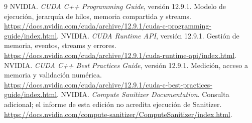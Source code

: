 \documentclass[12pt,a4paper,oneside]{report}
\begin{document}
\begin{thebibliography}{9}
 NVIDIA. \emph{CUDA C++ Programming Guide}, versión 12.9.1. Modelo de ejecución, jerarquía de hilos, memoria compartida y streams. \url{https://docs.nvidia.com/cuda/archive/12.9.1/cuda-c-programming-guide/index.html}.
 NVIDIA. \emph{CUDA Runtime API}, versión 12.9.1. Gestión de memoria, eventos, streams y errores. \url{https://docs.nvidia.com/cuda/archive/12.9.1/cuda-runtime-api/index.html}.
 NVIDIA. \emph{CUDA C++ Best Practices Guide}, versión 12.9.1. Medición, acceso a memoria y validación numérica. \url{https://docs.nvidia.com/cuda/archive/12.9.1/cuda-c-best-practices-guide/index.html}.
 NVIDIA. \emph{Compute Sanitizer Documentation}. Consulta adicional; el informe de esta edición no acredita ejecución de Sanitizer. \url{https://docs.nvidia.com/compute-sanitizer/ComputeSanitizer/index.html}.
\end{thebibliography}
\clearpage\renewcommand{\contentsname}{Índice detallado}\tableofcontents
\end{document}
